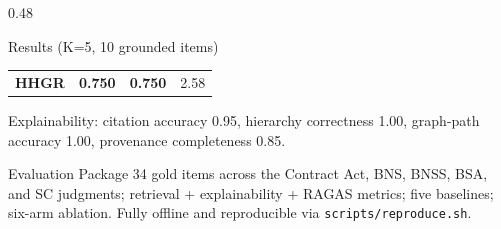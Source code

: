 \documentclass[portrait,fontscale=0.7]{beamer}
\begin{document}
\begin{frame}{}
\begin{columns}[t]
\begin{column}{0.48\textwidth}
\begin{block}{Results (K=5, 10 grounded items)}
\begin{center}
\begin{tabular}{lccc}
          \textbf{HHGR} & \textbf{0.750} & \textbf{0.750} & 2.58\\
        \end{tabular}
        \end{center}
        Explainability: citation accuracy 0.95, hierarchy correctness 1.00,
        graph-path accuracy 1.00, provenance completeness 0.85.
      \end{block}
      \begin{block}{Evaluation Package}
        34 gold items across the Contract Act, BNS, BNSS, BSA, and SC judgments;
        retrieval + explainability + RAGAS metrics; five baselines; six-arm
        ablation. Fully offline and reproducible via
        \texttt{scripts/reproduce.sh}.
      \end{block}
    \end{column}
  \end{columns}
\end{frame}
\end{document}
